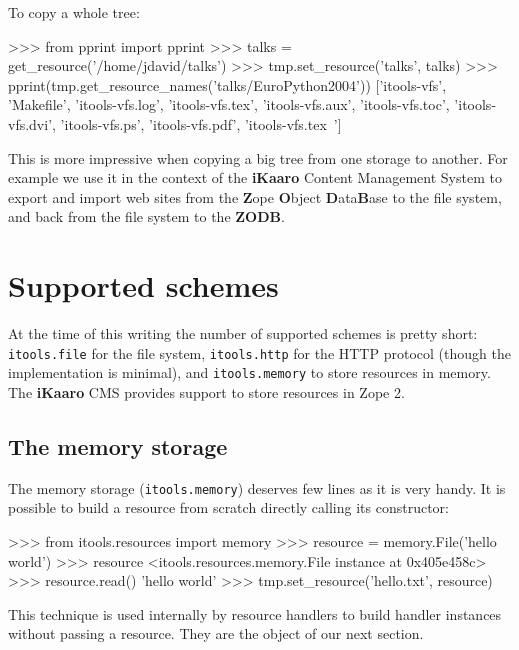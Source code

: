 To copy a whole tree:

\begin{code}
    >>> from pprint import pprint
    >>> talks = get_resource('/home/jdavid/talks')
    >>> tmp.set_resource('talks', talks)
    >>> pprint(tmp.get_resource_names('talks/EuroPython2004'))
    ['itools-vfs',
     'Makefile',
     'itools-vfs.log',
     'itools-vfs.tex',
     'itools-vfs.aux',
     'itools-vfs.toc',
     'itools-vfs.dvi',
     'itools-vfs.ps',
     'itools-vfs.pdf',
     'itools-vfs.tex~']
\end{code}

This is more impressive when copying a big tree from one storage to another.
For example we use it in the context of the {\bf iKaaro} Content Management
System to export and import web sites from the {\bf Z}ope {\bf O}bject
{\bf D}ata{\bf B}ase to the file system, and back from the file system to the
{\bf ZODB}.


\section{Supported schemes}

At the time of this writing the number of supported schemes is pretty short:
{\tt itools.file} for the file system, {\tt itools.http} for the HTTP
protocol (though the implementation is minimal), and {\tt itools.memory}
to store resources in memory. The {\bf iKaaro} CMS provides support to
store resources in Zope 2.

\subsection{The memory storage}

The memory storage ({\tt itools.memory}) deserves few lines as it is very
handy. It is possible to build a resource from scratch directly calling its
constructor:

\begin{code}
    >>> from itools.resources import memory
    >>> resource = memory.File('hello world')
    >>> resource
    <itools.resources.memory.File instance at 0x405e458c>
    >>> resource.read()
    'hello world'
    >>> tmp.set_resource('hello.txt', resource)
\end{code}

This technique is used internally by resource handlers to build handler
instances without passing a resource. They are the object of our next
section.
